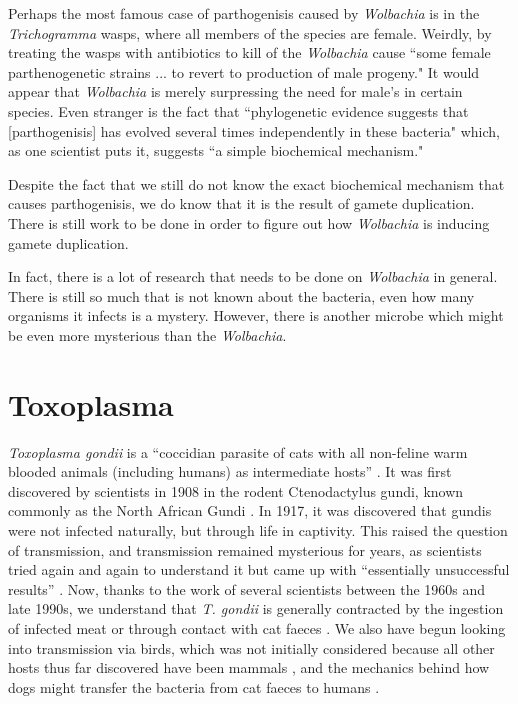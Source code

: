 \documentclass[twocolumn]{article}
\begin{document}
Perhaps the most famous case of parthogenisis caused by \textit{Wolbachia} is in the \textit{Trichogramma} wasps, where all members of the species are female. Weirdly, by treating the wasps with antibiotics to kill of the \textit{Wolbachia} cause ``some female parthenogenetic strains ... to revert to production of male progeny."\cite{Wpar_removal} It would appear that \textit{Wolbachia} is merely surpressing the need for male's in certain species. Even stranger is the fact that ``phylogenetic evidence suggests that [parthogenisis] has evolved several times independently in these bacteria" which, as one scientist puts it, suggests ``a simple biochemical mechanism."\cite{Wbio}  

Despite the fact that we still do not know the exact biochemical mechanism that causes parthogenisis, we do know that it is the result of gamete duplication.\cite{Wgamete_duplication} There is still work to be done in order to figure out how \textit{Wolbachia} is inducing gamete duplication.

In fact, there is a lot of research that needs to be done on \textit{Wolbachia} in general. There is still so much that is not known about the bacteria, even how many organisms it infects is a mystery. However, there is another microbe which might be even more mysterious than the \textit{Wolbachia}.

\section*{Toxoplasma}
\textit{Toxoplasma gondii} is a “coccidian parasite of cats with all non-feline warm blooded animals (including humans) as intermediate hosts” \cite{Tlife_cycle}. It was first discovered by scientists in 1908 in the rodent Ctenodactylus gundi, known commonly as the North African Gundi \cite{Tlife_cycle}. In 1917, it was discovered that gundis were not infected naturally, but through life in captivity. This raised the question of transmission, and transmission remained mysterious for years, as scientists tried again and again to understand it but came up with “essentially unsuccessful results” \cite{Tlife_cycle}. Now, thanks to the work of several scientists between the 1960s and late 1990s, we understand that \textit{T. gondii} is generally contracted by the ingestion of infected meat or through contact with cat faeces \cite{Tlife_cycle}. We also have begun looking into transmission via birds, which was not initially considered because all other hosts thus far discovered have been mammals \cite{Tbirds}, and the mechanics behind how dogs might transfer the bacteria from cat faeces to humans \cite{Tdogs}.
\end{document}
